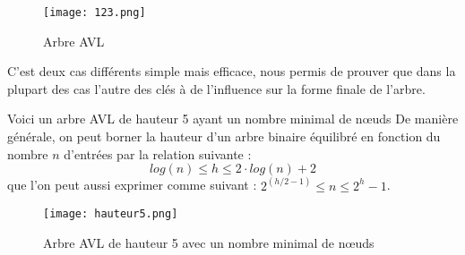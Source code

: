 \begin{figure}[!h]
	\centering
	\texttt{[image: 123.png]}
	\caption{Arbre AVL}
	\label{fig:equi}
\end{figure}

C'est deux cas différents simple mais efficace, nous permis de prouver que dans la plupart des cas l'autre des clés à de l'influence sur la forme finale de l'arbre.

Voici un arbre AVL de hauteur 5 ayant un nombre minimal de nœuds
De manière générale, on peut borner la hauteur d'un arbre binaire équilibré en fonction du nombre $n$ d'entrées par la relation suivante :
$$log( n ) \leq h \leq 2 \cdot log( n ) + 2$$
que l'on peut aussi exprimer comme suivant : $2^{(h/2 - 1)} \leq n \leq 2^h - 1$.

\begin{figure}[!h]
	\centering
	\texttt{[image: hauteur5.png]}
	\caption{Arbre AVL de hauteur 5 avec un nombre minimal de nœuds}
	\label{fig:equi}
\end{figure}
